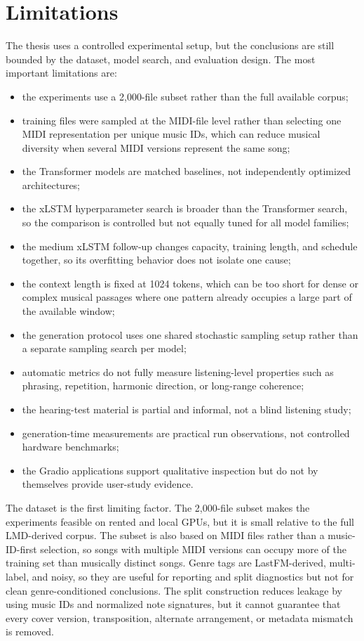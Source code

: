 \section{Limitations}

The thesis uses a controlled experimental setup, but the conclusions are still
bounded by the dataset, model search, and evaluation design. The most important
limitations are:
\begin{itemize}
	\item the experiments use a 2,000-file subset rather than the full available corpus;
	\item training files were sampled at the MIDI-file level rather than selecting one MIDI representation per unique music IDs, which can reduce musical diversity when several MIDI versions represent the same song;
	\item the Transformer models are matched baselines, not independently optimized architectures;
	\item the xLSTM hyperparameter search is broader than the Transformer search, so the comparison is controlled but not equally tuned for all model families;
	\item the medium xLSTM follow-up changes capacity, training length, and schedule together, so its overfitting behavior does not isolate one cause;
	\item the context length is fixed at 1024 tokens, which can be too short for dense or complex musical passages where one pattern already occupies a large part of the available window;
	\item the generation protocol uses one shared stochastic sampling setup rather than a separate sampling search per model;
	\item automatic metrics do not fully measure listening-level properties such as phrasing, repetition, harmonic direction, or long-range coherence;
	\item the hearing-test material is partial and informal, not a blind listening study;
	\item generation-time measurements are practical run observations, not controlled hardware benchmarks;
	\item the Gradio applications support qualitative inspection but do not by themselves provide user-study evidence.
\end{itemize}

The dataset is the first limiting factor. The 2,000-file subset makes the
experiments feasible on rented and local GPUs, but it is small relative to the
full LMD-derived corpus. The subset is also based on MIDI files rather than a
music-ID-first selection, so songs with multiple MIDI versions can occupy more
of the training set than musically distinct songs. Genre tags are LastFM-derived,
multi-label, and noisy, so they are useful for reporting and split diagnostics
but not for clean genre-conditioned conclusions. The split construction reduces
leakage by using music IDs and normalized note signatures, but it cannot
guarantee that every cover version, transposition, alternate arrangement, or
metadata mismatch is removed.

